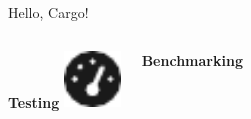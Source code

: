 \begin{frame}{Hello, Cargo!}
\begin{columns}[t, onlytextwidth]
                \textbf{Testing}
                \centering
                \includegraphics[height=1.5cm, keepaspectratio]{images/gauge.pdf}

                \textbf{Benchmarking}
        \end{columns}
    \end{frame}